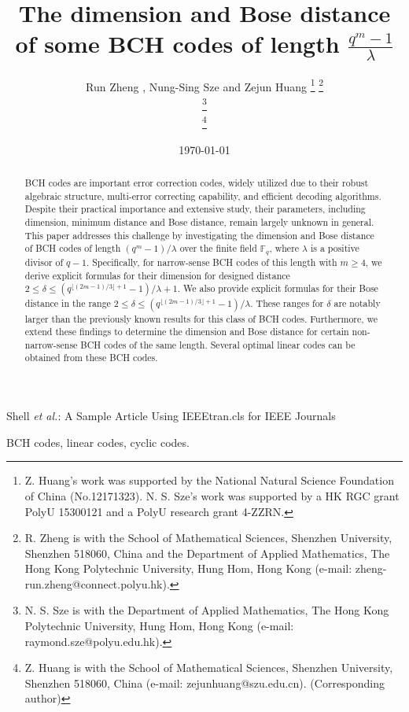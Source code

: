 \documentclass[journal,onecolumn]{IEEEtran}
\begin{document}
\title{The dimension and Bose distance of some  BCH codes of  length $\frac{q^{m}-1}{\lambda}$}
\author{Run Zheng ,  Nung-Sing Sze  
 and Zejun Huang 
\thanks{Z. Huang's work was supported by the National Natural Science Foundation of China (No.12171323).  N. S. Sze's work was supported by a HK RGC grant PolyU 15300121 and a PolyU
research grant 4-ZZRN.}%
\thanks{R. Zheng is with the School of Mathematical Sciences,
    Shenzhen University, Shenzhen 518060, China and the Department of Applied Mathematics, The Hong Kong Polytechnic University, Hung Hom, Hong Kong (e-mail: zheng-run.zheng@connect.polyu.hk).}

\thanks{N. S. Sze is with the Department of Applied Mathematics,
The Hong Kong Polytechnic University, Hung Hom, Hong Kong (e-mail:
raymond.sze@polyu.edu.hk).}

\thanks{Z. Huang is with the School of Mathematical Sciences,
    Shenzhen University, Shenzhen 518060, China (e-mail: zejunhuang@szu.edu.cn). (Corresponding author)}
}

\date{\today}%
%
{Shell \MakeLowercase{\textit{et al.}}: A Sample Article Using IEEEtran.cls for IEEE Journals}



\maketitle
\begin{abstract}
BCH codes are important error correction codes, widely utilized due to their robust algebraic structure, multi-error correcting capability, and efficient decoding algorithms. Despite their practical importance and extensive study, their  parameters, including dimension, minimum distance and Bose distance, remain largely unknown in general. This paper addresses this challenge by investigating the dimension and Bose distance of BCH codes of length $(q^m - 1)/\lambda$ over the finite field $\mathbb{F}_q$, where $\lambda$ is a positive divisor of $q - 1$.
Specifically, for narrow-sense BCH codes of this length with $m \geq 4$, we derive explicit formulas for their dimension for  designed distance  $2 \leq \delta \leq (q^{\lfloor (2m - 1)/3 \rfloor + 1} - 1)/{\lambda} + 1$. We also provide explicit formulas for their Bose distance in the range $2 \leq \delta \leq (q^{\lfloor (2m - 1)/3 \rfloor + 1} - 1)/{\lambda}$. These ranges for $\delta$ are notably larger  than the previously known results for this class of BCH codes. Furthermore, we extend these findings to determine the dimension and Bose distance for certain non-narrow-sense BCH codes of the same length. Several optimal linear codes can be obtained from these BCH codes.
\end{abstract}
\begin{IEEEkeywords}
BCH codes, linear codes, cyclic codes. 
\end{IEEEkeywords}
\end{document}
